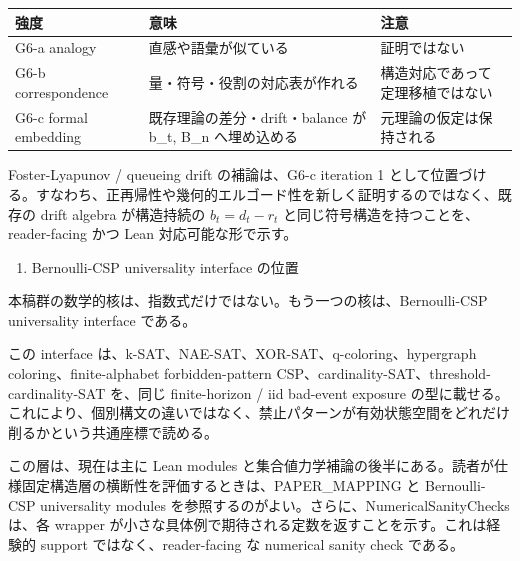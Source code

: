 \documentclass[12pt,a4paper]{article}
\begin{document}
{\def\LTcaptype{table} %
\begin{longtable}[]{@{}
  >{\raggedright\arraybackslash}p{}
  >{\raggedright\arraybackslash}p{}
  >{\raggedright\arraybackslash}p{}@{}}
\toprule\noalign{}
\begin{minipage}[b]{\linewidth}\raggedright
強度
\end{minipage} & \begin{minipage}[b]{\linewidth}\raggedright
意味
\end{minipage} & \begin{minipage}[b]{\linewidth}\raggedright
注意
\end{minipage} \\
\midrule\noalign{}
\endhead
\bottomrule\noalign{}
\endlastfoot
G6-a analogy & 直感や語彙が似ている & 証明ではない \\
G6-b correspondence & 量・符号・役割の対応表が作れる & 構造対応であって定理移植ではない \\
G6-c formal embedding & 既存理論の差分・drift・balance が b\_t, B\_n へ埋め込める & 元理論の仮定は保持される \\
\end{longtable}
}

Foster-Lyapunov / queueing drift の補論は、G6-c iteration 1 として位置づける。すなわち、正再帰性や幾何的エルゴード性を新しく証明するのではなく、既存の drift algebra が構造持続の \(b_{t}=d_{t}-r_{t}\) と同じ符号構造を持つことを、reader-facing かつ Lean 対応可能な形で示す。

\begin{enumerate}
\def\labelenumi{\arabic{enumi}.}
\setcounter{enumi}{7}
\tightlist
\item
  Bernoulli-CSP universality interface の位置
\end{enumerate}

本稿群の数学的核は、指数式だけではない。もう一つの核は、Bernoulli-CSP universality interface である。

この interface は、k-SAT、NAE-SAT、XOR-SAT、q-coloring、hypergraph coloring、finite-alphabet forbidden-pattern CSP、cardinality-SAT、threshold-cardinality-SAT を、同じ finite-horizon / iid bad-event exposure の型に載せる。これにより、個別構文の違いではなく、禁止パターンが有効状態空間をどれだけ削るかという共通座標で読める。

この層は、現在は主に Lean modules と集合値力学補論の後半にある。読者が仕様固定構造層の横断性を評価するときは、PAPER\_MAPPING と Bernoulli-CSP universality modules を参照するのがよい。さらに、NumericalSanityChecks は、各 wrapper が小さな具体例で期待される定数を返すことを示す。これは経験的 support ではなく、reader-facing な numerical sanity check である。
\end{document}
